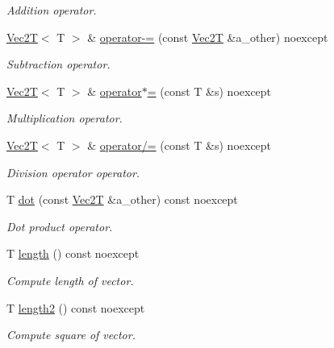 \begin{DoxyCompactItemize}
\begin{DoxyCompactList}\small\item\em Addition operator. \end{DoxyCompactList}\item 
\hyperlink{classVec2T}{Vec2T}$<$ T $>$ \& \hyperlink{classVec2T_a6c98f1e7b2bb5479e3616fbda7124313}{operator-\/=} (const \hyperlink{classVec2T}{Vec2T} \&a\+\_\+other) noexcept
\begin{DoxyCompactList}\small\item\em Subtraction operator. \end{DoxyCompactList}\item 
\hyperlink{classVec2T}{Vec2T}$<$ T $>$ \& \hyperlink{classVec2T_ad7525f66bf0c609e79e1d2590af6be0c}{operator$\ast$=} (const T \&s) noexcept
\begin{DoxyCompactList}\small\item\em Multiplication operator. \end{DoxyCompactList}\item 
\hyperlink{classVec2T}{Vec2T}$<$ T $>$ \& \hyperlink{classVec2T_a84e4a2ee2d84fbb42c84d0638ff929f8}{operator/=} (const T \&s) noexcept
\begin{DoxyCompactList}\small\item\em Division operator operator. \end{DoxyCompactList}\item 
T \hyperlink{classVec2T_ab7ed0195847b7a1037051402967780a3}{dot} (const \hyperlink{classVec2T}{Vec2T} \&a\+\_\+other) const noexcept
\begin{DoxyCompactList}\small\item\em Dot product operator. \end{DoxyCompactList}\item 
T \hyperlink{classVec2T_ad7965b8d549a5f9d08cab43760dab56b}{length} () const noexcept
\begin{DoxyCompactList}\small\item\em Compute length of vector. \end{DoxyCompactList}\item 
T \hyperlink{classVec2T_a9beb3ae1b8b76926f8864686cb6a2ace}{length2} () const noexcept
\begin{DoxyCompactList}\small\item\em Compute square of vector. \end{DoxyCompactList}\end{DoxyCompactItemize}
